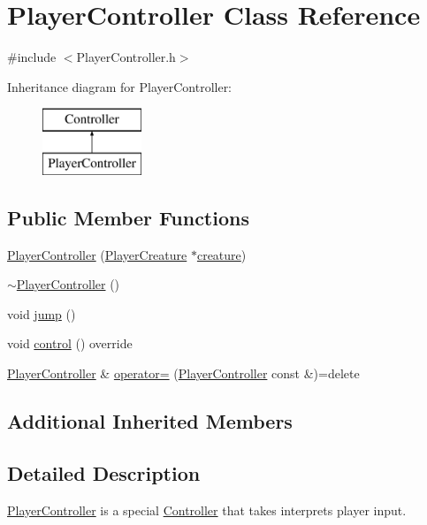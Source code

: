 \hypertarget{class_player_controller}{}\section{Player\+Controller Class Reference}
\label{class_player_controller}


{\ttfamily \#include $<$Player\+Controller.\+h$>$}

Inheritance diagram for Player\+Controller\+:\begin{figure}[H]
\begin{center}
\leavevmode
\includegraphics[height=2.000000cm]{class_player_controller}
\end{center}
\end{figure}
\subsection*{Public Member Functions}
\begin{DoxyCompactItemize}
\item 
\hyperlink{class_player_controller_a7bbc210a0a74324d106c9cafc66461cf}{Player\+Controller} (\hyperlink{class_player_creature}{Player\+Creature} $\ast$\hyperlink{class_controller_a54982a6e6ceaafdd59d72ddd7df013a1}{creature})
\item 
\hyperlink{class_player_controller_a27b597bc2dbe06e2464dea6cdb3fac96}{$\sim$\+Player\+Controller} ()
\item 
void \hyperlink{class_player_controller_acf2bb7065e2f16d9fbc312a54c384913}{jump} ()
\item 
void \hyperlink{class_player_controller_ab8fde5836dad1fc4dce56f12b50daf4b}{control} () override
\item 
\hyperlink{class_player_controller}{Player\+Controller} \& \hyperlink{class_player_controller_a28e9a35fa382d4db15c3445ef9217b03}{operator=} (\hyperlink{class_player_controller}{Player\+Controller} const \&)=delete
\end{DoxyCompactItemize}
\subsection*{Additional Inherited Members}


\subsection{Detailed Description}
\hyperlink{class_player_controller}{Player\+Controller} is a special \hyperlink{class_controller}{Controller} that takes interprets player input. 

